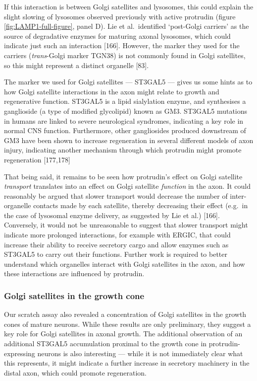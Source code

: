 \documentclass[
  12pt,
  a4paper,
]{book}
\begin{document}
If this interaction is between Golgi satellites and lysosomes, this could explain the slight slowing of lysosomes observed previously with active protrudin (figure \ref{fig:LAMP1-full-figure}, panel D). Lie et al.~identified `post-Golgi carriers' as the source of degradative enzymes for maturing axonal lysosomes, which could indicate just such an interaction {[}166{]}. However, the marker they used for the carriers (\emph{trans}-Golgi marker TGN38) is not commonly found in Golgi satellites, so this might represent a distinct organelle {[}83{]}.

The marker we used for Golgi satellites --- ST3GAL5 --- gives us some hints as to how Golgi satellite interactions in the axon might relate to growth and regenerative function. ST3GAL5 is a lipid sialylation enzyme, and synthesises a ganglioside (a type of modified glycolipid) known as GM3. ST3GAL5 mutations in humans are linked to severe neurological syndromes, indicating a key role in normal CNS function. Furthermore, other gangliosides produced downstream of GM3 have been shown to increase regeneration in several different models of axon injury, indicating another mechanism through which protrudin might promote regeneration {[}177,178{]}

That being said, it remains to be seen how protrudin's effect on Golgi satellite \emph{transport} translates into an effect on Golgi satellite \emph{function} in the axon. It could reasonably be argued that slower transport would decrease the number of inter-organelle contacts made by each satellite, thereby decreasing their effect (e.g.~in the case of lysosomal enzyme delivery, as suggested by Lie et al.) {[}166{]}. Conversely, it would not be unreasonable to suggest that slower transport might indicate more prolonged interactions, for example with ERGIC, that could increase their ability to receive secretory cargo and allow enzymes such as ST3GAL5 to carry out their functions. Further work is required to better understand which organelles interact with Golgi satellites in the axon, and how these interactions are influenced by protrudin.

\hypertarget{golgi-satellites-in-the-growth-cone}{%
\subsubsection{Golgi satellites in the growth cone}\label{golgi-satellites-in-the-growth-cone}}

Our scratch assay also revealed a concentration of Golgi satellites in the growth cones of mature neurons. While these results are only preliminary, they suggest a key role for Golgi satellites in axonal growth. The additional observation of an additional ST3GAL5 accumulation proximal to the growth cone in protrudin-expressing neurons is also interesting --- while it is not immediately clear what this represents, it might indicate a further increase in secretory machinery in the distal axon, which could promote regeneration.
\end{document}
